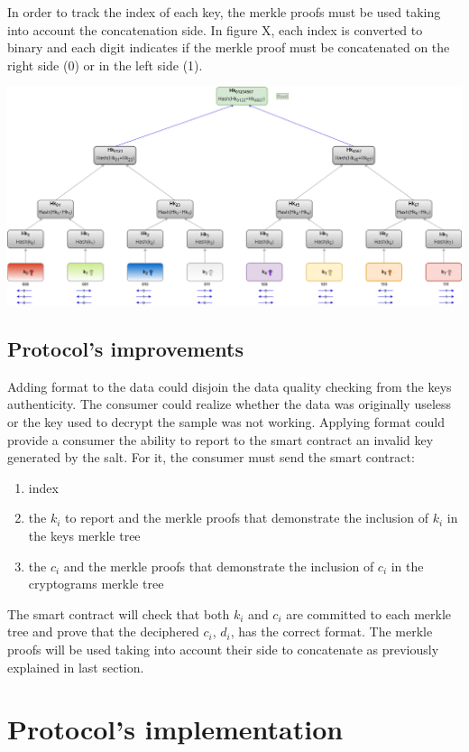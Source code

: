 \documentclass[]{article}
\begin{document}
	In order to track the index of each key, the merkle proofs must be used taking into account the concatenation side. In figure X, each index is converted to binary and each digit indicates if the merkle proof must be concatenated on the right side (0) or in the left side (1).
	
	\includegraphics[width=\textwidth,height=\textheight,keepaspectratio]{../figures/KeysMerkleTree_index}

	\subsection{Protocol's improvements}
	Adding format to the data could disjoin the data quality checking from the keys authenticity. The consumer could realize whether the data was originally useless or the key used to decrypt the sample was not working.
	Applying format could provide a consumer the ability to report to the smart contract an invalid key generated by the salt. For it, the consumer must send the smart contract:
	\begin{enumerate}
		 \item index
		 \item the $k_i$ to report and the merkle proofs that demonstrate the inclusion of $k_i$ in the keys merkle tree
		 \item the $c_i$ and the merkle proofs that demonstrate the inclusion of $c_i$ in the cryptograms merkle tree
	\end{enumerate}
	
	The smart contract will check that both $k_i$ and $c_i$ are committed to each merkle tree and prove that the deciphered $c_i$, $d_i$, has the correct format. The merkle proofs will be used taking into account their side to concatenate as previously explained in last section.
	
	
	\section{Protocol's implementation}
	
\end{document}
